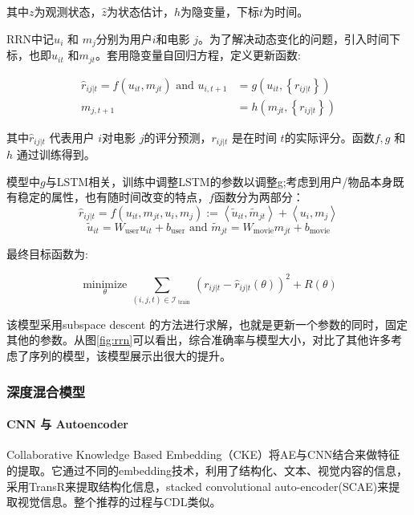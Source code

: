 其中$z$为观测状态，$\hat{z}$为状态估计，$h$为隐变量，下标$t$为时间。

RRN中记$u_{i}$ 和 $m_{j}$分别为用户$i$和电影
$j$。为了解决动态变化的问题，引入时间下标，也即$u_{i t}$ 和$m_{j t}$。套用隐变量自回归方程，定义更新函数:

\begin{equation}
\begin{aligned} \hat{r}_{i j | t}=f\left(u_{i t}, m_{j t}\right) \text { and } u_{i, t+1} &=g\left(u_{i t},\left\{r_{i j | t}\right\}\right) \\ m_{j, t+1} &=h\left(m_{j t},\left\{r_{i j | t}\right\}\right) \end{aligned}
\end{equation}

其中$\hat{r}_{i j | t}$ 代表用户 $i$对电影
$j$的评分预测，$r_{i j | t}$ 是在时间 $t $的实际评分。函数$f, g$ 和 $h$ 通过训练得到。

模型中$g$与LSTM相关，训练中调整LSTM的参数以调整g;考虑到用户/物品本身既有稳定的属性，也有随时间改变的特点，$f$函数分为两部分：
\begin{equation}
\hat{r}_{i j | t}=f\left(u_{i t}, m_{j t}, u_{i}, m_{j}\right) :=\left\langle\tilde{u}_{i t}, \tilde{m}_{j t}\right\rangle+\left\langle u_{i}, m_{j}\right\rangle
\end{equation}
\begin{equation}
\tilde{u}_{i t}=W_{\mathrm{user}} u_{i t}+b_{\mathrm{user}} \text { and } \tilde{m}_{j t}=W_{\mathrm{movie}} m_{j t}+b_{\mathrm{movie}}
\end{equation}

最终目标函数为:

\begin{equation}
\underset{\theta}{\operatorname{minimize}} \sum_{(i, j, t) \in \mathcal{I}_{\text { train }}}\left(r_{i j | t}-\hat{r}_{i j | t}(\theta)\right)^{2}+R(\theta)
\end{equation}

该模型采用subspace descent 的方法进行求解，也就是更新一个参数的同时，固定其他的参数。从图\ref{fig:rrn}可以看出，综合准确率与模型大小，对比了其他许多考虑了序列的模型，该模型展示出很大的提升。

\subsubsection{深度混合模型}
\paragraph{CNN 与 Autoencoder}
Collaborative Knowledge Based Embedding（CKE）\cite{zhang2016collaborative}将AE与CNN结合来做特征的提取。它通过不同的embedding技术，利用了结构化、文本、视觉内容的信息，采用TransR\cite{lin2015learning}来提取结构化信息，stacked convolutional auto-encoder(SCAE)来提取视觉信息。整个推荐的过程与CDL类似。
